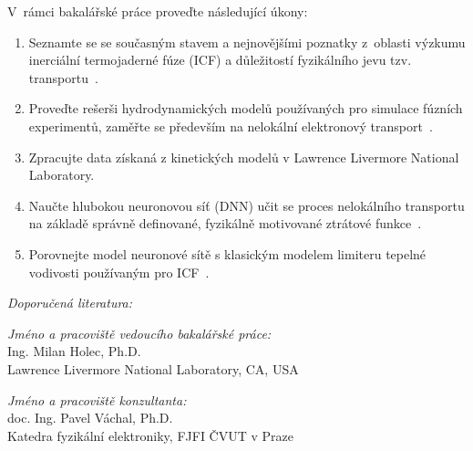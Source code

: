 \documentclass[11pt,a4paper]{article}
\begin{document}
V~rámci bakalářské práce proveďte následující úkony:
\begin{enumerate}
\item
  Seznamte se se současným stavem a nejnovějšími poznatky z~oblasti
  výzkumu inerciální termojaderné fúze (ICF) a důležitostí fyzikálního jevu tzv.
  transportu~\cite{lit:Abu-Shawareb_etal-PRL:22,lit:Casey_etal-PRL:21,lit:Rosen_etal-HEDP:11}.
\item
  Proveďte rešerši hydrodynamických modelů používaných pro simulace fúzních
  experimentů, zaměřte se především na nelokální elektronový
  transport~\cite{lit:Holec_Nikl_Weber-PoP:18}.
\item
  Zpracujte data získaná z kinetických modelů v Lawrence Livermore National Laboratory.
\item
  Naučte hlubokou neuronovou síť (DNN) učit se proces nelokálního transportu na
  základě správně definované, fyzikálně motivované ztrátové
  funkce~\cite{lit:PyToTut,lit:PyToInt,lit:PyToReg}.
\item
  Porovnejte model neuronové sítě s klasickým modelem limiteru tepelné vodivosti po\-u\-ží\-va\-ným pro ICF~\cite{lit:Chapman_etal-PoP:21}.
\end{enumerate}



\vspace{2ex}

\newpage

{\it Doporučená literatura:}
\vspace{1ex}


%

%
%
%


\vspace{4ex}

{\it Jméno a pracoviště vedoucího bakalářské práce:}\\[1mm]
Ing. Milan Holec, Ph.D.\\[1mm]
Lawrence Livermore National Laboratory, CA, USA

\vspace{3ex}

{\it Jméno a pracoviště konzultanta:}\\[1mm]
doc. Ing. Pavel Váchal, Ph.D. \\[1mm]
Katedra fyzikální elektroniky, FJFI ČVUT v Praze

\vspace{3ex}
\end{document}
